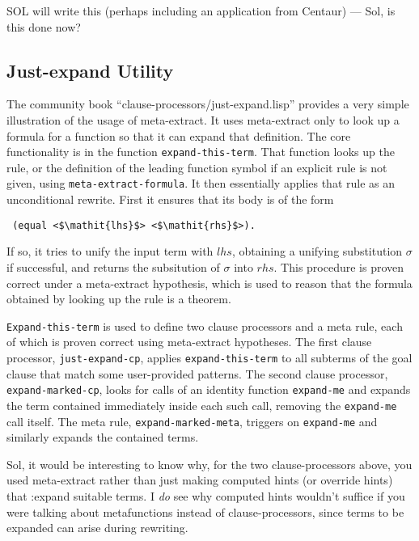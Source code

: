 \begin{mycomment}
 SOL will write this (perhaps including an application
  from Centaur)
--- Sol, is this done now?
\end{mycomment}

\subsection{Just-expand Utility}

The community book ``clause-processors/just-expand.lisp'' provides a
very simple illustration of the usage of meta-extract.  It uses
meta-extract only to look up a formula for a function so that it can
expand that definition.  The core functionality is in the function
\texttt{expand-this-term}.  That function looks up the rule, or the
definition of the leading function symbol if an explicit rule is not
given, using \texttt{meta-extract-formula}.  It then essentially
applies that rule as an unconditional rewrite.  First it ensures that
its body is of the form
\begin{lstlisting}
 (equal <$\mathit{lhs}$> <$\mathit{rhs}$>).
\end{lstlisting}
If so, it tries to unify the input term with $\mathit{lhs}$, obtaining
a unifying substitution $\sigma$ if successful, and returns the
subsitution of $\sigma$ into $\mathit{rhs}$.  This procedure is proven
correct under a meta-extract hypothesis, which is used to reason that
the formula obtained by looking up the rule is a theorem.

\texttt{Expand-this-term} is used to define two clause processors and
a meta rule, each of which is proven correct using meta-extract
hypotheses.  The first clause processor, \texttt{just-expand-cp},
applies \texttt{expand-this-term} to all subterms of the goal clause
that match some user-provided patterns.  The second clause processor,
\texttt{expand-marked-cp}, looks for calls of an identity function
\texttt{expand-me} and expands the term contained immediately inside
each such call, removing the \texttt{expand-me} call itself.  The meta
rule, \texttt{expand-marked-meta}, triggers on \texttt{expand-me} and
similarly expands the contained terms.

\begin{mycomment}
  Sol, it would be interesting to know why, for the two
  clause-processors above, you used meta-extract rather than just
  making computed hints (or override hints) that :expand suitable
  terms.  I {\em do} see why computed hints wouldn't suffice if you
  were talking about metafunctions instead of clause-processors, since
  terms to be expanded can arise during rewriting.
\end{mycomment}

